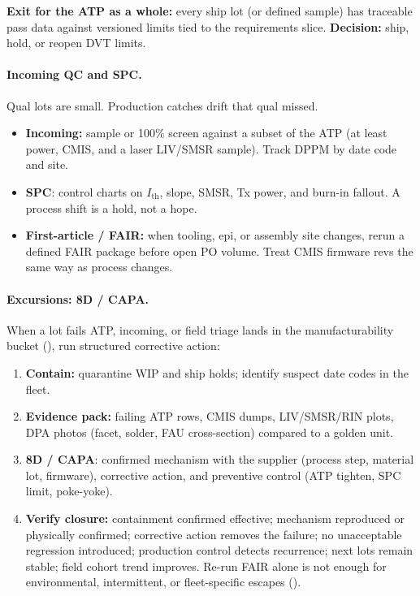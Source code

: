 \textbf{Exit for the ATP as a whole:} every ship lot (or defined sample) has
traceable pass data against versioned limits tied to the requirements slice.
\textbf{Decision:} ship, hold, or reopen DVT limits.

\paragraph{Incoming QC and SPC.}
Qual lots are small. Production catches drift that qual missed.

\begin{itemize}
\item \textbf{Incoming:} sample or 100\% screen against a subset of the ATP (at least
      power, CMIS, and a laser LIV/SMSR sample). Track DPPM by date code and site.
\item \textbf{SPC}: control charts on $I_\mathrm{th}$, slope, SMSR, Tx
      power, and burn-in fallout. A process shift is a hold, not a hope.
\item \textbf{First-article / FAIR:} when tooling, epi, or assembly site changes,
      rerun a defined FAIR package before open PO volume. Treat CMIS firmware revs
      the same way as process changes.
\end{itemize}

\paragraph{Excursions: 8D / CAPA.}
When a lot fails ATP, incoming, or field triage lands in the manufacturability
bucket (), run structured corrective action:

\begin{enumerate}
\item \textbf{Contain:} quarantine WIP and ship holds; identify suspect date codes
      in the fleet.
\item \textbf{Evidence pack:} failing ATP rows, CMIS dumps, LIV/SMSR/RIN plots, DPA
      photos (facet, solder, FAU cross-section) compared to a golden unit.
\item \textbf{8D / CAPA}: confirmed mechanism with the supplier (process step,
      material lot, firmware), corrective action, and preventive control (ATP tighten,
      SPC limit, poke-yoke).
\item \textbf{Verify closure:} containment confirmed effective; mechanism reproduced
      or physically confirmed; corrective action removes the failure; no
      unacceptable regression introduced; production control detects recurrence;
      next lots remain stable; field cohort trend improves. Re-run FAIR alone is
      not enough for environmental, intermittent, or fleet-specific escapes
      ().
\end{enumerate}

